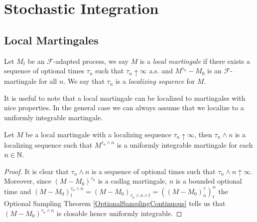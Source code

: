\chapter{Stochastic Integration}

\section{Local Martingales}

\begin{defn}Let $M_t$ be an $\mathcal{F}$-adapted process, we say $M$ is a \emph{local martingale} if there exists a sequence of optional times $\tau_n$ such that $\tau_n \uparrow \infty$ a.s. and $M^{\tau_n} - M_0$ is an $\mathcal{F}$-martingale for all $n$.  We say that $\tau_n$ is a \emph{localizing sequence} for $M$.
\end{defn}

It is useful  to note that a local martingale can be localized to martingales with nice properties.  In the general case we can always assume that we localize to a uniformly integrable martingale.
\begin{lem}\label{LocalMartingaleLocalizeToUniformlyIntegrable}Let $M$ be a local martingale with a localizing sequence $\tau_n \uparrow \infty$, then $\tau_n \wedge n$ is a localizing sequence such that $M^{\tau_n \wedge n}$ is a uniformly integrable martingale for each $n \in \mathbb{N}$.
\end{lem}
\begin{proof}
It is clear that $\tau_n \wedge n$ is a sequence of optional times such that $\tau_n \wedge n \uparrow \infty$.  Moreover, since $(M-M_0)^{\tau_n}$ is a cadlag martingale, $n$ is a bounded optional time and $(M-M_0)^{\tau_n \wedge n}_t = (M-M_0)_{\tau_n \wedge n \wedge t} = ((M-M_0)^\tau_n)^n_t$ the Optional Sampling Theorem \ref{OptionalSamplingContinuous} tells us that $(M-M_0)^{\tau_n \wedge n}$ is closable hence uniformly integrable.
\end{proof}

